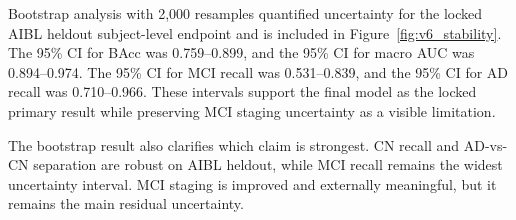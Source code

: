 \documentclass[12pt,a4paper]{article}
\begin{document}
Bootstrap analysis with 2{,}000 resamples quantified uncertainty for the locked AIBL heldout subject-level endpoint and is included in Figure~\ref{fig:v6_stability}. The 95\% CI for BAcc was 0.759--0.899, and the 95\% CI for macro AUC was 0.894--0.974. The 95\% CI for MCI recall was 0.531--0.839, and the 95\% CI for AD recall was 0.710--0.966. These intervals support the final model as the locked primary result while preserving MCI staging uncertainty as a visible limitation.

The bootstrap result also clarifies which claim is strongest. CN recall and AD-vs-CN separation are robust on AIBL heldout, while MCI recall remains the widest uncertainty interval. MCI staging is improved and externally meaningful, but it remains the main residual uncertainty.

\begin{figure}[p]
    \centering
\end{figure}
\end{document}
